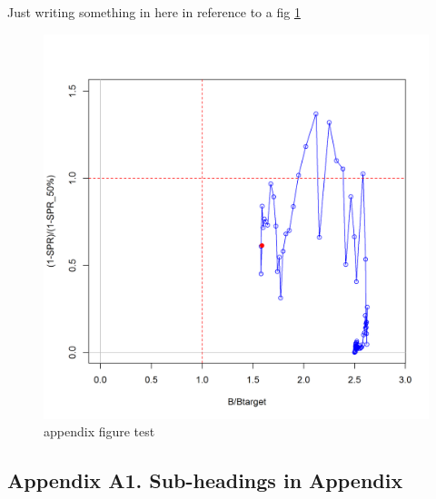\documentclass[12pt,]{article}
\begin{document}
\renewcommand{\thepage}{A-\arabic{page}}
\renewcommand{\thefigure}{A\arabic{figure}}
\renewcommand{\thetable}{A\arabic{table}}

\setcounter{page}{1} \setcounter{figure}{1} \setcounter{table}{1}

Just writing something in here in reference to a fig \ref{appendfig}

\begin{figure}[htbp]
\centering
\includegraphics{plots/SPR4_phase}
\caption{appendix figure test \label{appendfig}}
\end{figure}

\newpage 

\subsection*{Appendix A1. Sub-headings in
Appendix}\label{appendix-a1.-sub-headings-in-appendix}

\renewcommand{\thepage}{A1-\arabic{page}}
\renewcommand{\thefigure}{A1.\arabic{figure}}
\renewcommand{\thetable}{A1.\arabic{table}}

\setcounter{page}{1} \setcounter{figure}{1} \setcounter{table}{1}

\newpage
\end{document}
